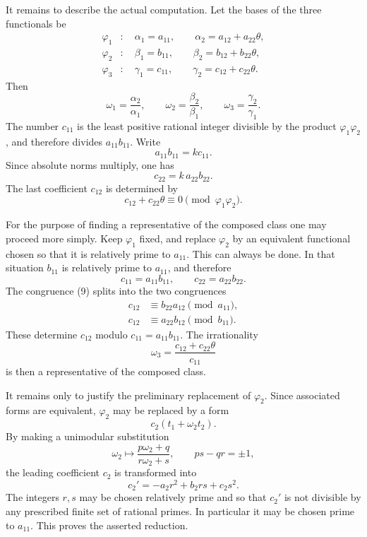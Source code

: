 \documentclass[11pt,a4paper]{book}
\begin{document}
It remains to describe the actual computation.  Let the bases of the three functionals be
\[
\begin{aligned}
  \varphi_1&:\quad
  \alpha_1=a_{11},\qquad
  \alpha_2=a_{12}+a_{22}\theta,\\
  \varphi_2&:\quad
  \beta_1=b_{11},\qquad
  \beta_2=b_{12}+b_{22}\theta,\\
  \varphi_3&:\quad
  \gamma_1=c_{11},\qquad
  \gamma_2=c_{12}+c_{22}\theta.
\end{aligned}
\tag{6}
\]
Then
\[
  \omega_1=\frac{\alpha_2}{\alpha_1},\qquad
  \omega_2=\frac{\beta_2}{\beta_1},\qquad
  \omega_3=\frac{\gamma_2}{\gamma_1}.
\]
The number \(c_{11}\) is the least positive rational integer divisible by the product \(\varphi_1\varphi_2\), and therefore divides \(a_{11}b_{11}\).  Write
\[
  a_{11}b_{11}=k c_{11}.
\tag{7}
\]
Since absolute norms multiply, one has
\[
  c_{22}=k\,a_{22}b_{22}.
\tag{8}
\]
The last coefficient \(c_{12}\) is determined by
\[
  c_{12}+c_{22}\theta\equiv0\pmod{\varphi_1\varphi_2}.
\tag{9}
\]

For the purpose of finding a representative of the composed class one may proceed more simply.  Keep \(\varphi_1\) fixed, and replace \(\varphi_2\) by an equivalent functional chosen so that it is relatively prime to \(a_{11}\).  This can always be done.  In that situation \(b_{11}\) is relatively prime to \(a_{11}\), and therefore
\[
  c_{11}=a_{11}b_{11},\qquad
  c_{22}=a_{22}b_{22}.
\tag{10}
\]
The congruence (9) splits into the two congruences
\[
\begin{aligned}
  c_{12}&\equiv b_{22}a_{12}\pmod{a_{11}},\\
  c_{12}&\equiv a_{22}b_{12}\pmod{b_{11}}.
\end{aligned}
\tag{11}
\]
These determine \(c_{12}\) modulo \(c_{11}=a_{11}b_{11}\).  The irrationality
\[
  \omega_3=\frac{c_{12}+c_{22}\theta}{c_{11}}
\tag{12}
\]
is then a representative of the composed class.

It remains only to justify the preliminary replacement of \(\varphi_2\).  Since associated forms are equivalent, \(\varphi_2\) may be replaced by a form
\[
  c_2(t_1+\omega_2 t_2).
\]
By making a unimodular substitution
\[
  \omega_2\mapsto\frac{p\omega_2+q}{r\omega_2+s},
  \qquad ps-qr=\pm1,
\]
the leading coefficient \(c_2\) is transformed into
\[
  c_2'=-a_2r^2+b_2rs+c_2s^2.
\]
The integers \(r,s\) may be chosen relatively prime and so that \(c_2'\) is not divisible by any prescribed finite set of rational primes.  In particular it may be chosen prime to \(a_{11}\).  This proves the asserted reduction.
\end{document}
